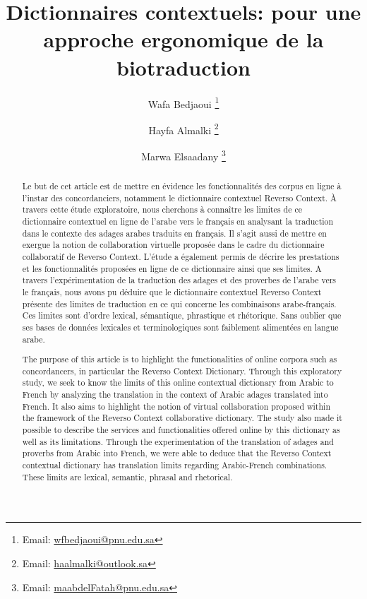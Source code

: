 \documentclass{textolivre}
\title{Dictionnaires contextuels: pour une approche ergonomique de la biotraduction}
\author[1]{Wafa Bedjaoui \orcid{0000-0002-0660-8418} \thanks{Email: \url{wfbedjaoui@pnu.edu.sa}}}
\author[1]{Hayfa Almalki \thanks{Email: \url{haalmalki@outlook.sa}}}
\author[1]{Marwa Elsaadany \orcid{0000-0002-6867-4250} \thanks{Email: \url{maabdelFatah@pnu.edu.sa}}}
\affil[1]{Princess Nourah bint Abdulrahman University, Riyad/Arabie Saoudite.}
\begin{document}
\maketitle

\begin{polyabstract}
\begin{abstract}
Le but de cet article est de mettre en évidence les fonctionnalités des corpus en ligne à l'instar des concordanciers, 
notamment le dictionnaire contextuel Reverso Context. À travers cette étude exploratoire, nous cherchons à connaître les limites 
de ce dictionnaire contextuel en ligne de l'arabe vers le français en analysant la traduction dans le contexte des adages arabes 
traduits en français. Il s'agit aussi de mettre en exergue la notion de collaboration virtuelle proposée dans le cadre du 
dictionnaire collaboratif de Reverso Context. L'étude a également permis de décrire les prestations et les fonctionnalités 
proposées en ligne de ce dictionnaire ainsi que ses limites. A travers l'expérimentation de la traduction des adages et des 
proverbes de l'arabe vers le français, nous avons pu déduire que le dictionnaire contextuel Reverso Context présente des limites 
de traduction en ce qui concerne les combinaisons arabe-français. Ces limites sont d’ordre lexical, sémantique, phrastique et 
rhétorique. Sans oublier que ses bases de données lexicales et terminologiques sont faiblement alimentées en langue arabe.

\end{abstract}

\begin{english}
\begin{abstract}
The purpose of this article is to highlight the functionalities of online corpora such as concordancers, 
in particular the Reverso Context Dictionary. Through this exploratory study, we seek to know the limits 
of this online contextual dictionary from Arabic to French by analyzing the translation in the context of 
Arabic adages translated into French. It also aims to highlight the notion of virtual collaboration proposed 
within the framework of the Reverso Context collaborative dictionary. The study also made it possible to 
describe the services and functionalities offered online by this dictionary as well as its limitations. 
Through the experimentation of the translation of adages and proverbs from Arabic into French, we were able 
to deduce that the Reverso Context contextual dictionary has translation limits regarding Arabic-French 
combinations. These limits are lexical, semantic, phrasal and rhetorical.


\end{abstract}
\end{english}
\end{polyabstract}
\end{document}
